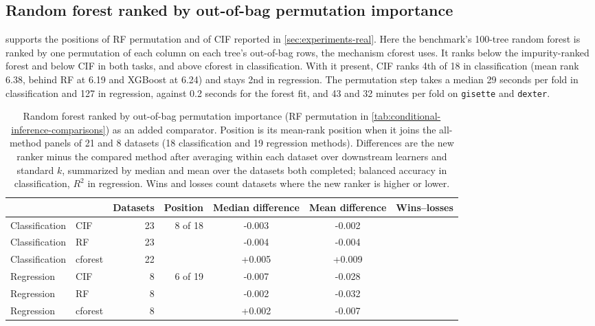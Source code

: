 \subsection{Random forest ranked by out-of-bag permutation importance}

 supports the positions of RF permutation and
of CIF reported in \cref{sec:experiments-real}. Here the benchmark's 100-tree
random forest is ranked by one permutation of each column on each tree's
out-of-bag rows, the mechanism cforest uses. It ranks below the
impurity-ranked forest and below CIF in both tasks, and above cforest in
classification. With it present, CIF ranks 4th of 18 in classification (mean
rank 6.38, behind RF at 6.19 and XGBoost at 6.24) and stays 2nd in regression.
The permutation step takes a median 29 seconds per fold in classification and
127 in regression, against 0.2 seconds for the forest fit, and 43 and 32
minutes per fold on \nolinkurl{gisette} and \nolinkurl{dexter}.

\begin{table}[!htbp]
  \centering
  \footnotesize
  \setlength{\tabcolsep}{5pt}
  \begin{tabular}{@{}llrrS[table-format=+1.3]S[table-format=+1.3]c@{}}
    \toprule
     &  & {Datasets} & {Position} & {Median difference} & {Mean difference} & Wins--losses \\
    \midrule
    Classification & CIF & 23 & 8 of 18 & -0.003 & -0.002 &  \\
    Classification & RF & 23 & & -0.004 & -0.004 &  \\
    Classification & cforest & 22 & & +0.005 & +0.009 &  \\
    Regression & CIF & 8 & 6 of 19 & -0.007 & -0.028 &  \\
    Regression & RF & 8 & & -0.002 & -0.032 &  \\
    Regression & cforest & 8 & & +0.002 & -0.007 &  \\
    \bottomrule
  \end{tabular}
  \caption{Random forest ranked by out-of-bag permutation importance (RF
  permutation in \cref{tab:conditional-inference-comparisons}) as an added
  comparator. Position is its mean-rank position when it joins the all-method
  panels of 21 and 8 datasets (18 classification and 19 regression methods).
  Differences are the new ranker minus the compared method after averaging
  within each dataset over downstream learners and standard $k$, summarized by
  median and mean over the datasets both completed; balanced accuracy in
  classification, $R^2$ in regression. Wins and losses count datasets where the new ranker
  is higher or lower.}
  \label{tab:rf-oobperm-benchmark}
\end{table}

